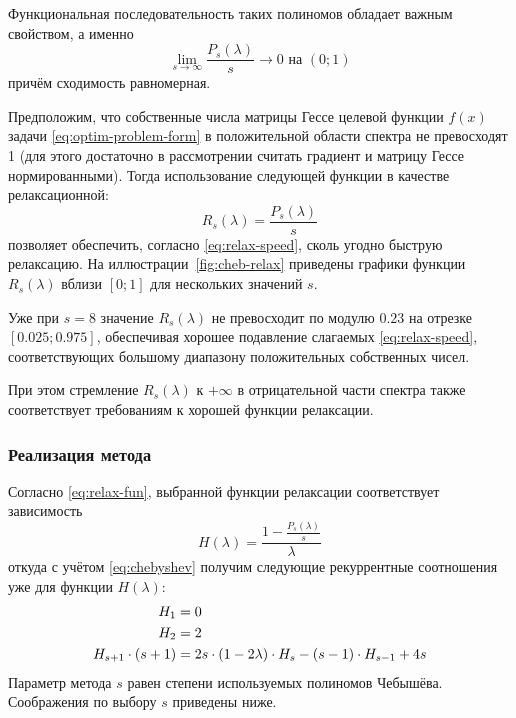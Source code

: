 Функциональная последовательность таких полиномов обладает важным
свойством, а именно
\begin{equation}
  \label{eq:cheb-limit}
  \lim_{s\to\infty}{\frac{P_s(\lambda)}{s}} \to 0 \text{ на } (0;1)
\end{equation}
причём сходимость равномерная.

Предположим, что собственные числа матрицы Гессе целевой функции
$f(x)$ задачи \eqref{eq:optim-problem-form} в положительной области
спектра не превосходят 1 (для этого достаточно в рассмотрении считать
градиент и матрицу Гессе нормированными). Тогда использование
следующей функции в качестве релаксационной:
\begin{equation}
  \label{eq:cheb-relax}
  R_s(\lambda) = \frac{P_s(\lambda)}{s}
\end{equation}
позволяет обеспечить, согласно \eqref{eq:relax-speed}, сколь угодно
быструю релаксацию. На иллюстрации \ref{fig:cheb-relax} приведены
графики функции $R_s(\lambda)$ вблизи $[0;1]$ для нескольких значений
$s$.



Уже при $s=8$ значение $R_s(\lambda)$ не превосходит по модулю $0.23$
на отрезке $[0.025; 0.975]$, обеспечивая хорошее подавление слагаемых
\eqref{eq:relax-speed}, соответствующих большому диапазону
положительных собственных чисел.

При этом стремление $R_s(\lambda)$ к $+\infty$ в
отрицательной части спектра также соответствует требованиям к хорошей
функции релаксации.

\subsubsection{Реализация метода}
Согласно \eqref{eq:relax-fun}, выбранной функции релаксации
соответствует зависимость
\begin{equation*}
  H(\lambda) = \frac{1-\frac{P_s(\lambda)}{s}}{\lambda}
\end{equation*}
откуда с учётом \eqref{eq:chebyshev} получим следующие рекуррентные
соотношения уже для функции $H(\lambda)$:
\begin{equation}
  \label{eq:cheb-scalarfun}
  \begin{aligned}
    H_1 &= 0 \\
    H_2 &= 2 \\
    H_{s+1} \cdot (s+1) &= 2s\cdot(1-2\lambda)\cdot H_s-(s-1)\cdot
    H_{s-1}+4s
  \end{aligned}
\end{equation}
Параметр метода $s$ равен степени используемых полиномов Чебышёва.
Соображения по выбору $s$ приведены ниже.

